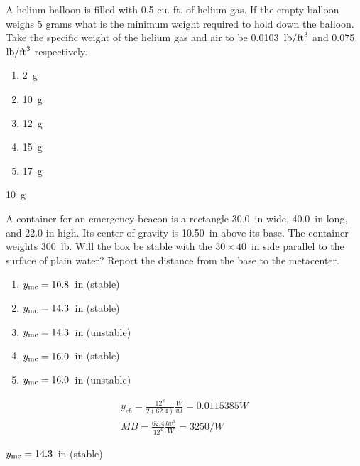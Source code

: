 \documentclass[multi,preview,varwidth=false,border=5,12pt]{standalone}
\begin{document}
\begin{question}

A helium balloon is filled with 0.5 cu. ft. of helium gas.  If the empty balloon weighs 5 grams what is the minimum weight required to hold down the balloon.  Take the specific weight of the helium gas and air to be 0.0103~$\mathrm{lb}/\mathrm{ft}^3$ and 0.075~$\mathrm{lb}/\mathrm{ft}^3$ respectively.

\begin{enumerate}
  \item 2~g
  \item 10~g
  \item 12~g
  \item 15~g
  \item 17~g
\end{enumerate}

\begin{solution}
    10~g
\end{solution}

\end{question}


\begin{question}

A container for an emergency beacon is a rectangle 30.0~in wide, 40.0~in long, and 22.0 in high.  Its center of gravity is 10.50~in above its base.  The container weights 300~lb.  Will the box be stable with the $30\times 40$~in side parallel to the surface of plain water?  Report the distance from the base to the metacenter.

\begin{enumerate}
  \item $y_{\rm mc}=10.8$~in (stable)
  \item $y_{\rm mc}=14.3$~in (stable)
  \item $y_{\rm mc}=14.3$~in (unstable)
  \item $y_{\rm mc}=16.0$~in (stable)
  \item $y_{\rm mc}=16.0$~in (unstable)
\end{enumerate}

\begin{solution}

    \begin{align*}
    y_{cb}=\frac{12^3}{2(62.4)}\frac{W}{wl}=0.0115385W\nonumber\\
    MB=\frac{62.4}{12^4}\frac{lw^3}{W}=3250/W
    \end{align*}

    $y_{\rm mc}=14.3$~in (stable)

\end{solution}

\end{question}
\end{document}
